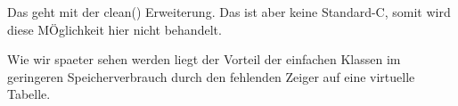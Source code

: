 \begin{note}
	Das geht mit der clean() Erweiterung. Das ist aber keine Standard-C, somit wird diese MÖglichkeit hier nicht behandelt.
\end{note}




Wie wir spaeter sehen werden liegt der Vorteil der einfachen Klassen im geringeren Speicherverbrauch durch den fehlenden Zeiger auf eine virtuelle Tabelle.
